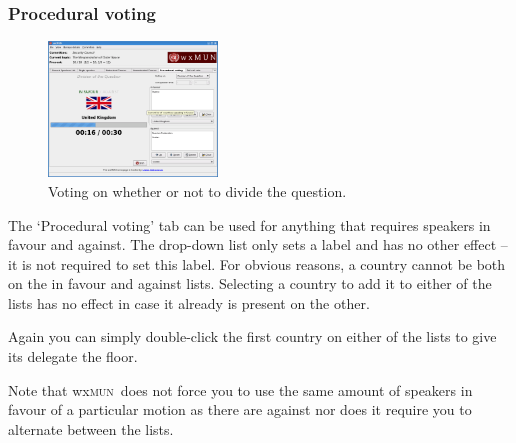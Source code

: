 \documentclass[11pt, a4paper]{article}
\newcommand\wxMUN{wx\textsc{mun}}
\begin{document}
\subsubsection{Procedural voting}
\begin{figure}
\includegraphics[width=0.4\textwidth]{screenshots/proc_voting.png}
\caption{Voting on whether or not to divide the question.}
\end{figure}

The `Procedural voting' tab can be used for anything that requires speakers in favour and against. The drop-down list only sets a label and has no other effect -- it is not required to set this label. For obvious reasons, a country cannot be both on the in favour and against lists. Selecting a country to add it to either of the lists has no effect in case it already is present on the other.

Again you can simply double-click the first country on either of the lists to give its delegate the floor. 

Note that \wxMUN\ does not force you to use the same amount of speakers in favour of a particular motion as there are against nor does it require you to alternate between the lists.
\end{document}
